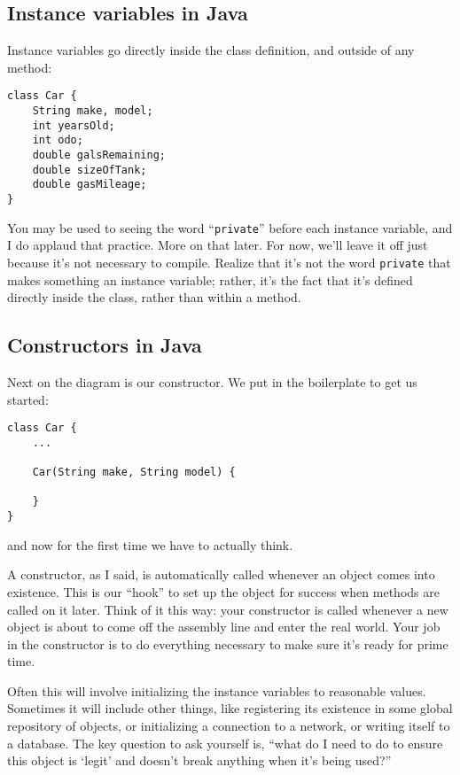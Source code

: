 \subsection{Instance variables in Java}

Instance variables go directly inside the class definition, and outside of any
method:

\begin{Verbatim}[samepage=true,fontsize=\footnotesize,frame=single]
class Car {
    String make, model;
    int yearsOld;
    int odo;
    double galsRemaining;
    double sizeOfTank;
    double gasMileage;    
}
\end{Verbatim}

You may be used to seeing the word ``\texttt{private}'' before each instance
variable, and I do applaud that practice. More on that later. For now, we'll
leave it off just because it's not necessary to compile. Realize that it's not
the word \texttt{private} that makes something an instance variable; rather,
it's the fact that it's defined directly inside the class, rather than within
a method.

\subsection{Constructors in Java}

Next on the diagram is our constructor. We put in the boilerplate to get us
started:

\begin{Verbatim}[samepage=true,fontsize=\footnotesize,frame=single]
class Car {
    ...

    Car(String make, String model) {

    }
}
\end{Verbatim}

and now for the first time we have to actually think.

A constructor, as I said, is automatically called whenever an object comes
into existence. This is our ``hook'' to set up the object for success when
methods are called on it later. Think of it this way: your constructor is
called whenever a new object is about to come off the assembly line and enter
the real world. Your job in the constructor is to do everything necessary to
make sure it's ready for prime time.

Often this will involve initializing the instance variables to reasonable
values. Sometimes it will include other things, like registering its existence
in some global repository of objects, or initializing a connection to a
network, or writing itself to a database. The key question to ask yourself is,
``what do I need to do to ensure this object is `legit' and doesn't break
anything when it's being used?''

